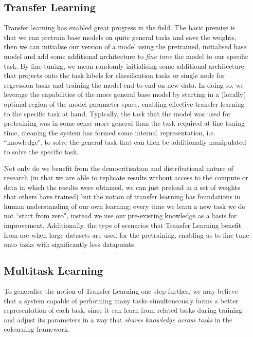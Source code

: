 \subsection{Transfer Learning} \label{section:intro:intrototransfer}
Transfer learning has enabled great progress in the field. The basic premise is that we can pretrain base models on quite general tasks and save the weights, then we can initialise our version of a model using the pretrained, initialised base model and add some additional architecture to \textit{fine tune} the model to our specific task. By fine tuning, we mean randomly initialising some additional architecture that projects onto the task labels for classification tasks or single node for regression tasks and training the model end-to-end on new data. In doing so, we leverage the capabilities of the more general base model by starting in a (locally) optimal region of the model parameter space, enabling effective transfer learning to the specific task at hand. Typically, the task that the model was used for pretraining was in some sense more general than the task required at fine tuning time, meaning the system has formed some internal representation, i.e. ``knowledge", to solve the general task that can then be additionally manipulated to solve the specific task.

Not only do we benefit from the democritisation and distributional nature of research (in that we are able to replicate results without access to the compute or data in which the results were obtained, we can just preload in a set of weights that others have trained) but the notion of transfer learning has foundations in human understanding of our own learning; every time we learn a new task we do not ``start from zero", instead we use our pre-existing knowledge as a basis for improvement. Additionally, the type of scenarios that Transfer Learning benefit from are when large datasets are used for the pretraining, enabling us to fine tune onto tasks with significantly less datapoints.

\subsection{Multitask Learning} \label{section:intro:introtomultitask}
To generalise the notion of Transfer Learning one step further, we may believe that a system capable of performing many tasks simulteneously forms a better representation of each task, since it can learn from related tasks during training and adjust its parameters in a way that \textit{shares knowledge across tasks} in the colearning framework. 

